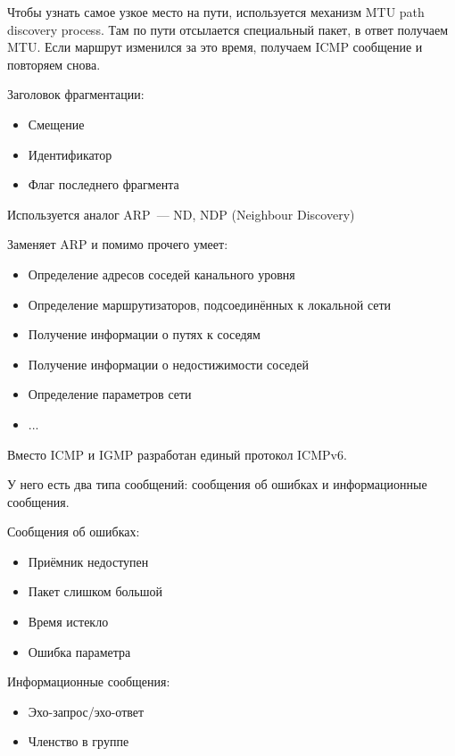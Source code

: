 Чтобы узнать самое узкое место на пути, используется механизм MTU path discovery process. Там по пути отсылается специальный пакет, в ответ получаем MTU. Если маршрут изменился за это время, получаем ICMP сообщение и повторяем снова.

Заголовок фрагментации:
\begin{itemize}
    \item Смещение
    \item Идентификатор
    \item Флаг последнего фрагмента
\end{itemize}


Используется аналог ARP~--- ND, NDP (Neighbour Discovery)

Заменяет ARP и помимо прочего умеет:
\begin{itemize}
    \item Определение адресов соседей канального уровня
    \item Определение маршрутизаторов, подсоединённых к локальной сети
    \item Получение информации о путях к соседям
    \item Получение информации о недостижимости соседей
    \item Определение параметров сети
    \item ...
\end{itemize}


Вместо ICMP и IGMP разработан единый протокол ICMPv6.

У него есть два типа сообщений: сообщения об ошибках и информационные сообщения.

Сообщения об ошибках:
\begin{itemize}
    \item Приёмник недоступен
    \item Пакет слишком большой
    \item Время истекло
    \item Ошибка параметра
\end{itemize}

Информационные сообщения:
\begin{itemize}
    \item Эхо-запрос/эхо-ответ
    \item Членство в группе
\end{itemize}


